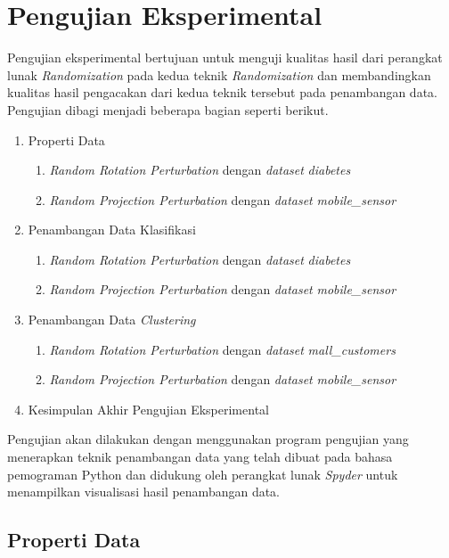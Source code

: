 \section{Pengujian Eksperimental}
\label{sec:pengujianeksperimental}

Pengujian eksperimental bertujuan untuk menguji kualitas hasil dari perangkat lunak \textit{Randomization} pada kedua teknik \textit{Randomization} dan membandingkan kualitas hasil pengacakan dari kedua teknik tersebut pada penambangan data. Pengujian dibagi menjadi beberapa bagian seperti berikut.

\begin{enumerate}
	\item Properti Data
	\begin{enumerate}
		\item \textit{Random Rotation Perturbation} dengan \textit{dataset} \textit{diabetes}
		\item \textit{Random Projection Perturbation} dengan \textit{dataset} \textit{mobile\_sensor}
	\end{enumerate}
	\item Penambangan Data Klasifikasi
	\begin{enumerate}
		\item \textit{Random Rotation Perturbation} dengan \textit{dataset} \textit{diabetes}
		\item \textit{Random Projection Perturbation} dengan \textit{dataset} \textit{mobile\_sensor}
	\end{enumerate}
	\item Penambangan Data \textit{Clustering}
	\begin{enumerate}
		\item \textit{Random Rotation Perturbation} dengan \textit{dataset} \textit{mall\_customers}
		\item \textit{Random Projection Perturbation} dengan \textit{dataset} \textit{mobile\_sensor}
	\end{enumerate}
	\item Kesimpulan Akhir Pengujian Eksperimental
\end{enumerate}

Pengujian akan dilakukan dengan menggunakan program pengujian yang menerapkan teknik penambangan data yang telah dibuat pada bahasa pemograman Python dan didukung oleh perangkat lunak \textit{Spyder} untuk menampilkan visualisasi hasil penambangan data.

\subsection{Properti Data}
\label{subsec:pengujian-properti}

